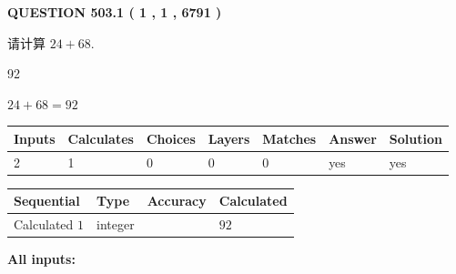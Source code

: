 \documentclass{ctexart}
\begin{document}
\vspace{0.2in}
  
{\textbf{\Large{QUESTION
503.1 
 ( 1 , 1 , 6791 )
}}}
  
  
 
请计算 $ %
24 +  %
68 $.
 
 
 
\noindent{}
 
 

92
 
 
\noindent{}
 
 

 
 
 
\noindent{}
 
 

$ %
24 +  %
68=   %
92$
 
 
\noindent{}
 
 

 
   
   
   
   
\noindent\begin{tabular}{|l|l|l|l|l|l|l|}
 \hline
Inputs & Calculates & Choices & Layers & Matches & Answer & Solution \\ \hline
 2  & 
 1  & 
 0
  & 
 0  & 
 0  & 
  yes & 
  yes 
  \\ \hline
 \end{tabular}
   
   
   
   
\noindent{}
   
   
  
  
\noindent\begin{tabular}{|l|l|l|l|}
\hline
 Sequential & Type & Accuracy & Calculated \\ 
\hline
 
 
  Calculated $  1 $ & integer &  & 
  $ 92 $ 
 \\  \hline  
 \end{tabular}
   
   
   
   
\noindent\vspace{0.1in}\hspace{-0.08in} {\textbf{\Large{All inputs: }}}
   
\end{document}
